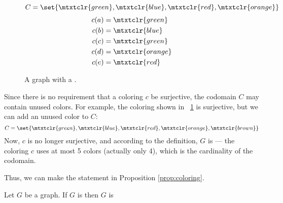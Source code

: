 \begin{figure}[H]
  \begin{minipage}{3in}
    \centering
  \end{minipage}
  \begin{minipage}{3in}
    \centering
    \(C=\set{\mtxtclr{green},\mtxtclr{blue},\mtxtclr{red},\mtxtclr{orange}}\)
    \begin{align*}
      c(a) &= \mtxtclr{green} \\
      c(b) &= \mtxtclr{blue} \\
      c(c) &= \mtxtclr{green} \\
      c(d) &= \mtxtclr{orange} \\
      c(e) &= \mtxtclr{red}
    \end{align*}
  \end{minipage}
  \caption{A graph with a .}
  \label{fig:exproper}
\end{figure}

Since there is no requirement that a coloring \(c\) be surjective, the codomain \(C\) may contain unused colors.
For example, the coloring shown in \figurename~\ref{fig:exproper} is surjective, but we can add an unused color to
\(C\):
\[C=\set{\mtxtclr{green},\mtxtclr{blue},\mtxtclr{red},\mtxtclr{orange},\mtxtclr{brown}}\]
Now, \(c\) is no longer surjective, and according to the definition, \(G\) is  --- the coloring \(c\)
uses at most 5 colors (actually only 4), which is the cardinality of the codomain.

Thus, we can make the statement in Proposition \ref{prop:coloring}.

\begin{proposition}
  \label{prop:coloring}
  Let \(G\) be a graph.  If \(G\) is  then \(G\) is 
\end{proposition}

